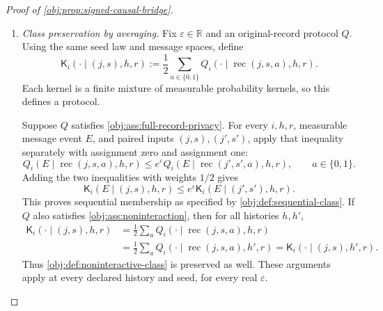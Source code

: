 \documentclass[11pt]{article}
\begin{document}
\begin{proof}[Proof of \cref{obj:prop:signed-causal-bridge}]
\begin{enumerate}
Define the observed-record reconstruction map on the whole paired
alphabet and both assignment values by
\[
\operatorname{rec}(j,s,a)
:=\left(j,a,\frac{1+s(2a-1)}2\right),
\qquad
j\in[d],\quad s\in\{-1,1\},\quad a\in\{0,1\}.
\]
Its outcome coordinate is binary. Summing the full-data atom masses over
the unused potential outcome gives
\[
\begin{aligned}
G_\theta(X=j,S=s,A=a)
&=\frac1{2d}\,
\pi_{aj}\!\left(\frac{1+s(2a-1)}2\right)\\
&=\frac1{2d}\,\frac{1+s\theta_j}{2}
=\frac{P_\theta(j,s)}2.
\end{aligned}
\]
Indeed, for \(a=0\), the reconstructed outcome is \((1-s)/2\), so the
two choices of \(s\) select the failure and success masses of
\(\operatorname{Bernoulli}((1-\theta_j)/2)\). For \(a=1\), it is
\((1+s)/2\), selecting the success and failure masses of
\(\operatorname{Bernoulli}((1+\theta_j)/2)\). In both cases the selected
mass is \((1+s\theta_j)/2\). Thus the joint signed-input and assignment
law is
\[
\mathcal L_{G_\theta}(X,S,A)
=P_\theta\otimes\operatorname{Bernoulli}(1/2).
\]

For every binary observed record, \((2A-1)^2=1\), and therefore
\[
S(2A-1)
=(2A-1)(2Y-1)(2A-1)=2Y-1.
\]
This identity holds pointwise and hence \(G_\theta\)-almost surely.

\item \emph{Class preservation by averaging.}
Fix \(\varepsilon\in\mathbb R\) and an original-record protocol \(Q\).
Using the same seed law and message spaces, define
\[
\mathsf K_i(\cdot\mid(j,s),h,r)
:=\frac12\sum_{a\in\{0,1\}}
Q_i(\cdot\mid\operatorname{rec}(j,s,a),h,r).
\]
Each kernel is a finite mixture of measurable probability kernels, so
this defines a protocol.

Suppose \(Q\) satisfies \cref{obj:ass:full-record-privacy}. For every
\(i,h,r\), measurable message event \(E\), and paired inputs
\((j,s),(j',s')\), apply that inequality separately with assignment zero
and assignment one:
\[
Q_i(E\mid\operatorname{rec}(j,s,a),h,r)
\le e^\varepsilon
Q_i(E\mid\operatorname{rec}(j',s',a),h,r),
\qquad a\in\{0,1\}.
\]
Adding the two inequalities with weights \(1/2\) gives
\[
\mathsf K_i(E\mid(j,s),h,r)
\le e^\varepsilon\mathsf K_i(E\mid(j',s'),h,r).
\]
This proves sequential membership as specified by
\cref{obj:def:sequential-class}. If \(Q\) also satisfies
\cref{obj:ass:noninteraction}, then for all histories \(h,h'\),
\[
\begin{aligned}
\mathsf K_i(\cdot\mid(j,s),h,r)
&=\frac12\sum_a
Q_i(\cdot\mid\operatorname{rec}(j,s,a),h,r)\\
&=\frac12\sum_a
Q_i(\cdot\mid\operatorname{rec}(j,s,a),h',r)
=\mathsf K_i(\cdot\mid(j,s),h',r).
\end{aligned}
\]
Thus \cref{obj:def:noninteractive-class} is preserved as well. These
arguments apply at every declared history and seed, for every real
\(\varepsilon\).


\end{enumerate}
\end{proof}
\end{document}

